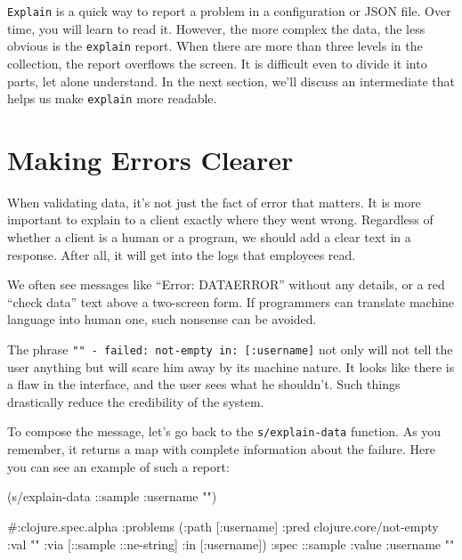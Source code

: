 \verb|Explain| is a quick way to report a problem in a configuration or JSON file. Over time, you will learn to read it. However, the more complex the data, the less obvious is the \verb|explain| report. When there are more than three levels in the collection, the report overflows the screen. It is difficult even to divide it into parts, let alone understand. In the next section, we'll discuss an intermediate that helps us make \verb|explain| more readable.

\section{Making Errors Clearer}


\label{spec-messages}

When validating data, it's not just the fact of error that matters. It is more important to explain to a client exactly where they went wrong. Regardless of whether a client is a human or a program, we should add a clear text in a response. After all, it will get into the logs that employees read.

We often see messages like “Error: DATAERROR” without any details, or a red “check data” text above a two-screen form. If programmers can translate machine language into human one, such nonsense can be avoided.


The phrase \texttt{"" - failed: not-empty in: [:user\-name]} not only will not tell the user anything but will scare him away by its machine nature. It looks like there is a flaw in the interface, and the user sees what he shouldn't. Such things drastically reduce the credibility of the system.

To compose the message, let's go back to the \verb|s/explain-data| function. As you remember, it returns a map with complete information about the failure. Here you can see an example of such a report:

\begin{english}
  \begin{clojure}
(s/explain-data ::sample {:username ""})

#:clojure.spec.alpha
{:problems
 ({:path [:username]
   :pred clojure.core/not-empty
 :val ""
   :via [::sample ::ne-string]
   :in [:username]})
 :spec ::sample
 :value {:username ""}}
  \end{clojure}
\end{english}

